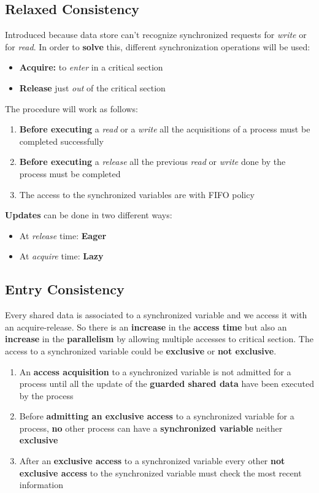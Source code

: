 \subsection{Relaxed Consistency}
Introduced because data store can't recognize synchronized requests for \textit{write} or for \textit{read}. In order to \textbf{solve} this,  different synchronization operations will be used:
\begin{itemize}
    \item \textbf{Acquire:} to \textit{enter} in a critical section
    \item \textbf{Release} just \textit{out} of the critical section
\end{itemize}
The procedure will work as follows:
\begin{enumerate}
    \item \textbf{Before executing} a \textit{read} or a \textit{write} all the acquisitions of a process must be completed successfully
    \item \textbf{Before executing} a \textit{release} all the previous \textit{read} or \textit{write} done by the process must be completed
    \item The access to the synchronized variables are with FIFO policy
\end{enumerate}
\textbf{Updates} can be done in two different ways:
\begin{itemize}
    \item At \textit{release} time: \textbf{Eager}
    \item At \textit{acquire} time: \textbf{Lazy}
\end{itemize}

\subsection{Entry Consistency}
Every shared data is associated to a synchronized variable and we access it with an acquire-release. So there is an \textbf{increase} in the \textbf{access time} but also an \textbf{increase} in the
\textbf{parallelism} by allowing multiple accesses to critical section. The access to a synchronized variable could be \textbf{exclusive} or \textbf{not exclusive}.
\begin{enumerate}
    \item An \textbf{access acquisition} to a synchronized variable is not admitted for a process until all the update of the \textbf{guarded shared data} have been executed by the process
    \item Before \textbf{admitting an exclusive access} to a synchronized variable for a process, \textbf{no} other process can have a \textbf{synchronized variable} neither \textbf{exclusive}
    \item After an \textbf{exclusive access} to a synchronized variable every other \textbf{not exclusive access} to the synchronized variable must check the most recent information
\end{enumerate}
\newpage
